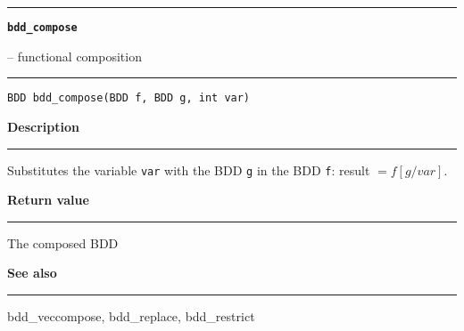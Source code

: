 \begin{minipage}{\textwidth}

\noindent\begin{minipage}{\textwidth}
\rule{\textwidth}{0.5mm}
{\tt\bf bdd\_compose }
\--- functional composition  \hspace{\fill}
\\\rule[1.5ex]{\textwidth}{0.5mm}
\end{minipage}

\noindent\begin{verbatim}
BDD bdd_compose(BDD f, BDD g, int var) 
\end{verbatim}

\vspace{\parsep}\noindent
{\bf Description}\\\rule[1.5ex]{\textwidth}{0.2mm}\vspace{-1.5ex}\setlength{\parindent}{1em}
Substitutes the variable {\tt var} with the BDD {\tt g} in
           the BDD {\tt f}: result $= f[g/var]$. 

\setlength{\parindent}{0em}\vspace{\parsep}\vspace{\baselineskip}\noindent
{\bf Return value}\\\rule[1.5ex]{\textwidth}{0.2mm}\vspace{-1.5ex}
The composed BDD 

\vspace{\parsep}\vspace{\baselineskip}\noindent
{\bf See also}\\\rule[1.5ex]{\textwidth}{0.2mm}\vspace{-1.5ex}
bdd\_veccompose, bdd\_replace, bdd\_restrict 
\end{minipage}
\vspace{8ex}
